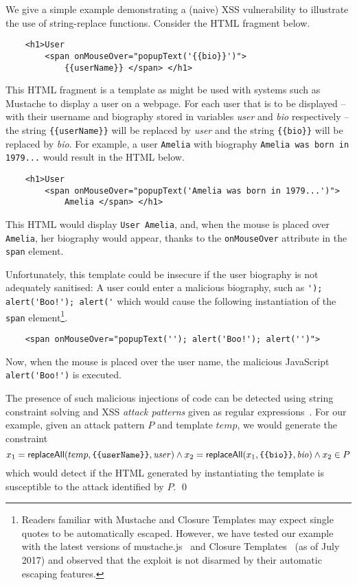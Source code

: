 

\begin{example}
We give a simple example demonstrating a (naive) XSS vulnerability to illustrate the use of string-replace functions.
Consider the HTML fragment below.
\begin{verbatim}
    <h1>User 
        <span onMouseOver="popupText('{{bio}}')">
            {{userName}} </span> </h1>
\end{verbatim}
This HTML fragment is a template as might be used with systems such as Mustache to display a user on a webpage.
For each user that is to be displayed -- with their username and biography stored in variables \emph{user} and \emph{bio} respectively -- the string \verb+{{userName}}+ will be replaced by \emph{user} and the string \verb+{{bio}}+ will be replaced by \emph{bio}.
For example, a user \verb+Amelia+ with biography \verb+Amelia was born in 1979...+ would result in the HTML below.
\begin{verbatim}
    <h1>User 
        <span onMouseOver="popupText('Amelia was born in 1979...')">
            Amelia </span> </h1>
\end{verbatim}
This HTML would display \verb+User Amelia+, and, when the mouse is placed over \verb+Amelia+, her biography would appear, thanks to the \verb+onMouseOver+ attribute in the \verb+span+ element.

Unfortunately, this template could be insecure if the user biography is not adequately sanitised: 
A user could enter a malicious biography, such as \verb+'); alert('Boo!'); alert('+ which would cause the following instantiation of the \verb+span+ element\footnote{
	Readers familiar with Mustache and Closure Templates may expect single quotes to be automatically escaped.
	However, we have tested our example with the latest versions of mustache.js~\cite{MustacheJS} and Closure Templates~\cite{Closure} (as of July 2017) and observed that the exploit is not disarmed by their automatic escaping features.
}.
\begin{verbatim}
    <span onMouseOver="popupText(''); alert('Boo!'); alert('')">
\end{verbatim}
Now, when the mouse is placed over the user name, the malicious JavaScript \verb+alert('Boo!')+ is executed.

The presence of such malicious injections of code can be detected using string constraint solving and XSS \emph{attack patterns} given as regular expressions~\cite{BCFJKKV08,SAHMMS10,YABI14}.
For our example, given an attack pattern $P$ and template $temp$, we would generate the constraint
\[
    x_1 = \replaceall(temp, \verb+{{userName}}+, \mathit{user})
    \land
    x_2 = \replaceall(x_1, \verb+{{bio}}+, \mathit{bio})
    \land
    x_2 \in P
\]
which would detect if the HTML generated by instantiating the template is
    susceptible to the attack identified by $P$. \qed
\end{example}

